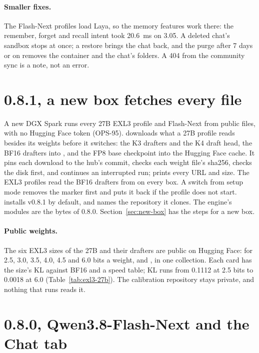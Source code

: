 \paragraph{Smaller fixes.} The Flash-Next profiles load Laya, so the memory features work there: the remember, forget and recall intent took 20.6~ms on 3.05. A deleted chat's sandbox stops at once; a restore brings the chat back, and the purge after 7 days or on  removes the container and the chat's folders. A 404 from the community sync is a note, not an error.

\section{0.8.1, a new box fetches every file}

A new DGX Spark runs every 27B EXL3 profile and Flash-Next from public files, with no Hugging Face token (OPS-95).  downloads what a 27B profile reads besides its weights before it switches: the K3 drafters and the K4 draft head, the BF16 drafters into , and the FP8 base checkpoint into the Hugging Face cache. It pins each download to the hub's commit, checks each weight file's sha256, checks the disk first, and continues an interrupted run;  prints every URL and size. The EXL3 profiles read the BF16 drafters from  on every box. A switch from setup mode removes the marker first and puts it back if the profile does not start.  installs v0.8.1 by default, and  names the repository it clones. The engine's modules are the bytes of 0.8.0. Section~\ref{sec:new-box} has the steps for a new box.

\paragraph{Public weights.} The six EXL3 sizes of the 27B and their drafters are public on Hugging Face:  for 2.5, 3.0, 3.5, 4.0, 4.5 and 6.0 bits a weight, and , in one collection. Each card has the size's KL against BF16 and a speed table; KL runs from 0.1112 at 2.5 bits to 0.0018 at 6.0 (Table~\ref{tab:exl3-27b}). The calibration repository stays private, and nothing that runs reads it.


\section{0.8.0, Qwen3.8-Flash-Next and the Chat tab}\label{sec:changelog-080}

